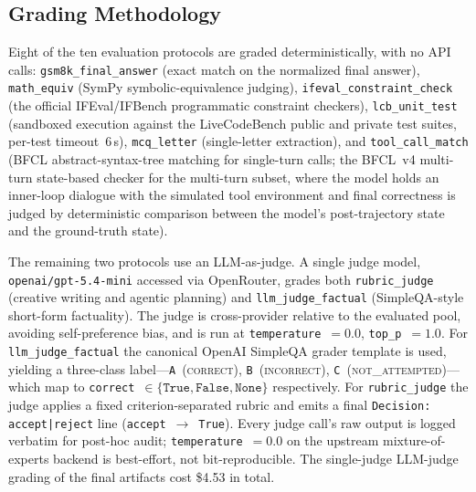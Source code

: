 \documentclass[11pt,a4paper]{article}
\begin{document}
\subsection{Grading Methodology}

Eight of the ten evaluation protocols are graded deterministically, with no API
calls: \texttt{gsm8k\_final\_answer} (exact match on the normalized final
answer), \texttt{math\_equiv} (SymPy symbolic-equivalence judging),
\texttt{ifeval\_constraint\_check} (the official IFEval/IFBench programmatic
constraint checkers), \texttt{lcb\_unit\_test} (sandboxed execution against the
LiveCodeBench public and private test suites, per-test timeout~6\,s),
\texttt{mcq\_letter} (single-letter extraction), and \texttt{tool\_call\_match}
(BFCL abstract-syntax-tree matching for single-turn calls; the BFCL~v4
multi-turn state-based checker for the multi-turn subset, where the model
holds an inner-loop dialogue with the simulated tool environment and final
correctness is judged by deterministic comparison between the model's
post-trajectory state and the ground-truth state).

The remaining two protocols use an LLM-as-judge. A single judge model,
\texttt{openai/gpt-5.4-mini} accessed via OpenRouter, grades both
\texttt{rubric\_judge} (creative writing and agentic planning) and
\texttt{llm\_judge\_factual} (SimpleQA-style short-form factuality). The judge is
cross-provider relative to the evaluated pool, avoiding self-preference bias, and
is run at \texttt{temperature}~$=0.0$, \texttt{top\_p}~$=1.0$. For
\texttt{llm\_judge\_factual} the canonical OpenAI SimpleQA grader template is
used, yielding a three-class label---\texttt{A}~(\textsc{correct}),
\texttt{B}~(\textsc{incorrect}), \texttt{C}~(\textsc{not\_attempted})---which map
to \texttt{correct}~$\in\{\texttt{True},\texttt{False},\texttt{None}\}$
respectively. For \texttt{rubric\_judge} the judge applies a fixed
criterion-separated rubric and emits a final \texttt{Decision: accept|reject}
line (\texttt{accept}~$\rightarrow$~\texttt{True}). Every judge call's raw output
is logged verbatim for post-hoc audit; \texttt{temperature}~$=0.0$ on the
upstream mixture-of-experts backend is best-effort, not bit-reproducible. The
single-judge LLM-judge grading of the final artifacts cost \$4.53 in total.
\end{document}

